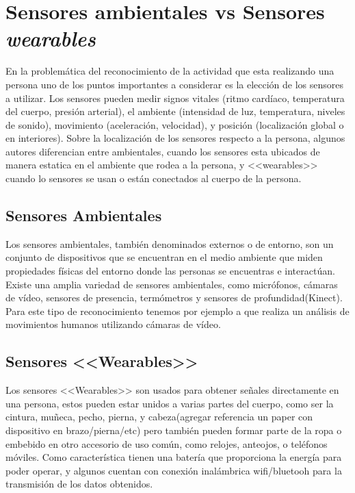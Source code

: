 \section{Sensores ambientales vs Sensores \emph{wearables}}
\label{sec24:sensores}
En la problemática del reconocimiento de la actividad que esta realizando una persona uno de los puntos importantes a considerar es la elección de los sensores a utilizar. Los sensores pueden medir signos vitales (ritmo cardíaco, temperatura del cuerpo, presión arterial), el ambiente (intensidad de luz, temperatura, niveles de sonido), movimiento (aceleración, velocidad), y posición (localización global o en interiores).
Sobre la localización de los sensores respecto a la persona, algunos autores \cite{ReyesOrtiz2015} diferencian entre ambientales, cuando los sensores esta ubicados de manera estatica en el ambiente que rodea a la persona, y <<wearables>> cuando lo sensores se usan o están conectados al cuerpo de la persona.

\subsection{Sensores Ambientales}

Los sensores ambientales, también denominados externos o de entorno, son un conjunto de dispositivos que se encuentran en el medio ambiente que miden propiedades físicas del entorno donde las personas se encuentras e interactúan. Existe una amplia variedad de sensores ambientales, como micrófonos, cámaras de vídeo, sensores de presencia, termómetros y sensores de profundidad(Kinect). Para este tipo de reconocimiento tenemos por ejemplo a \cite{Poppe2007} que realiza un análisis de movimientos humanos utilizando cámaras de vídeo.

\subsection{Sensores <<Wearables>>}

Los sensores <<Wearables>> son usados para obtener señales directamente en una persona, estos pueden estar unidos a varias partes del cuerpo, como ser la cintura, muñeca, pecho, pierna, y cabeza(agregar referencia un paper con dispositivo en brazo/pierna/etc) pero también pueden formar parte de la ropa o embebido en otro accesorio de uso común, como relojes, anteojos, o teléfonos móviles. Como característica tienen una batería que proporciona la energía para poder operar, y algunos cuentan con conexión inalámbrica wifi/bluetooh para la transmisión de los datos obtenidos.

